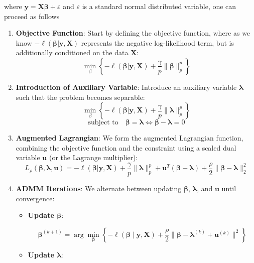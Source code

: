 where \(\boldsymbol{y} = \boldsymbol{X} \boldsymbol{\beta} + \varepsilon\) and \(\varepsilon\) is a standard normal distributed variable, one can proceed as follows
\begin{enumerate}
  \item \textbf{Objective Function}: Start by defining the objective function, where as we know \(- \ell(\boldsymbol{\beta} | \boldsymbol{y}, \boldsymbol{X})\) represents the negative log-likelihood term, but is additionally conditioned on the data $\boldsymbol{X}$:
    \[
    \min_{\beta}\left\{-\ell(\boldsymbol{\beta} | \boldsymbol{y}, \boldsymbol{X}) + \frac{\gamma}{p}\|\boldsymbol{\beta}\|_p^p\right\}
    \]
    
  \item \textbf{Introduction of Auxiliary Variable}: Introduce an auxiliary variable \(\boldsymbol{\lambda}\) such that the problem becomes separable:
  $$
    \min_{\beta}\left\{-\ell(\boldsymbol{\beta} | \boldsymbol{y}, \boldsymbol{X}) + \frac{\gamma}{p}\|\boldsymbol{\lambda}\|_p^p\right\} $$
    $$\text{subject to} \quad \boldsymbol{\beta} = \boldsymbol{\lambda} \iff \boldsymbol{\beta} - \boldsymbol{\lambda}  = 0$$
  \item \textbf{Augmented Lagrangian}: We form the augmented Lagrangian function, combining the objective function and the constraint using a scaled dual variable \(\boldsymbol{u}\) (or the Lagrange multiplier):
    \[
    L_{\rho}(\boldsymbol{\beta}, \boldsymbol{\lambda}, \boldsymbol{u}) = -\ell(\boldsymbol{\beta} | \boldsymbol{y}, \boldsymbol{X}) + \frac{\gamma}{p}\|\boldsymbol{\lambda}\|_p^p + \boldsymbol{u}^T(\boldsymbol{\beta} - \boldsymbol{\lambda}) + \frac{\rho}{2} \lVert \boldsymbol{\beta} - \boldsymbol{\lambda} \rVert_{2}^2
    \]
  
  \item \textbf{ADMM Iterations}: We alternate between updating \(\boldsymbol{\beta}\), \(\boldsymbol{\lambda}\), and \(\boldsymbol{u}\) until convergence:
    \begin{itemize}
    \item \textbf{Update \( \boldsymbol{\beta} \)}:
   
    \[
    \boldsymbol{\beta}^{(k+1)} = \arg \min_{\boldsymbol{\beta}} \left\{-\ell(\boldsymbol{\beta} \mid \boldsymbol{y}, \boldsymbol{X}) + \frac{\rho}{2}\|\boldsymbol{\beta} - \boldsymbol{\lambda}^{(k)} + \boldsymbol{u}^{(k)}\|^2\right\}
    \]

    \item \textbf{Update \( \boldsymbol{\lambda} \)}:


\end{itemize}
\end{enumerate}
